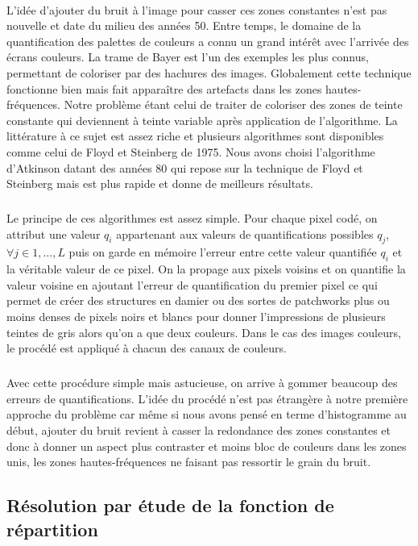 \documentclass{article}
\begin{document}
\paragraph*{}
L'idée d'ajouter du bruit à l'image pour casser ces zones constantes n'est pas nouvelle et date du milieu des années 50. Entre temps, le domaine de la quantification des palettes de couleurs a connu un grand intérêt avec l'arrivée des écrans couleurs. La trame de Bayer est l'un des exemples les plus connus, permettant de coloriser par des hachures des images. Globalement cette technique fonctionne bien mais fait apparaître des artefacts dans les zones hautes-fréquences. Notre problème étant celui de traiter de coloriser des zones de teinte constante qui deviennent à teinte variable après application de l'algorithme. La littérature à ce sujet est assez riche et plusieurs algorithmes sont disponibles comme celui de Floyd et Steinberg de 1975. Nous avons choisi l'algorithme d'Atkinson datant des années 80 qui repose sur la technique de Floyd et Steinberg mais est plus rapide et donne de meilleurs résultats.
\subparagraph*{}
Le principe de ces algorithmes est assez simple. Pour chaque pixel codé, on attribut une valeur $q_i$ appartenant aux valeurs de quantifications possibles $q_j$, $\forall j \in {1,..., L}$ puis on garde en mémoire l'erreur entre cette valeur quantifiée $q_i$ et la véritable valeur de ce pixel. On la propage aux pixels voisins et on quantifie la valeur voisine en ajoutant l'erreur de quantification du premier pixel ce qui permet de créer des structures en damier ou des sortes de patchworks plus ou moins denses de pixels noirs et blancs pour donner l'impressions de plusieurs teintes de gris alors qu'on a que deux couleurs. Dans le cas des images couleurs, le procédé est appliqué à chacun des canaux de couleurs.
\subparagraph*{}
Avec cette procédure simple mais astucieuse, on arrive à gommer beaucoup des erreurs de quantifications. L'idée du procédé n'est pas étrangère à notre première approche du problème car même si nous avons pensé en terme d'histogramme au début, ajouter du bruit revient à casser la redondance des zones constantes et donc à donner un aspect plus contraster et moins bloc de couleurs dans les zones unis, les zones hautes-fréquences ne faisant pas ressortir le grain du bruit.

\subsection{Résolution par étude de la fonction de répartition}
\end{document}
